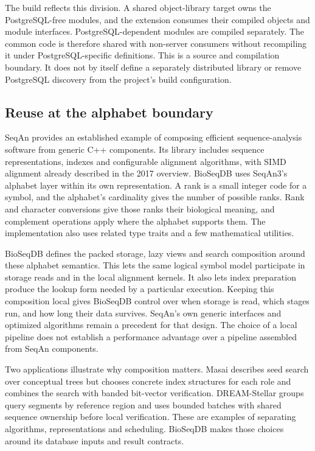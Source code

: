 The build reflects this division. A shared object-library target owns the
PostgreSQL-free modules, and the extension consumes their compiled objects
and module interfaces. PostgreSQL-dependent modules are compiled separately.
The common code is therefore shared with non-server consumers without
recompiling it under PostgreSQL-specific definitions. This is a source and
compilation boundary. It does not by itself define a separately distributed
library or remove PostgreSQL discovery from the project's build configuration.

\subsection{Reuse at the alphabet boundary}
\label{sec:arch-seqan-reuse}

SeqAn provides an established example of composing efficient sequence-analysis
software from generic C++ components. Its library includes sequence
representations, indexes and configurable alignment algorithms, with SIMD
alignment already described in the 2017 overview.\autocite{REINERT2017157,seqanManual}
BioSeqDB uses SeqAn3's alphabet layer within its own representation. A rank
is a small integer code for a symbol, and the alphabet's cardinality gives
the number of possible ranks. Rank and character conversions
give those ranks their biological meaning, and complement operations apply
where the alphabet supports them.\autocite{seqan3AlphabetsDocs}
The implementation also uses related type traits and a few mathematical
utilities.

BioSeqDB defines the packed storage, lazy views and search composition around
these alphabet semantics. This lets the same logical symbol model participate
in storage reads and in the local alignment kernels. It also lets index
preparation produce the lookup form needed by a particular execution.
Keeping this composition local gives BioSeqDB control over when storage is
read, which stages run, and how long their data survives. SeqAn's own generic
interfaces and optimized algorithms remain a precedent for that design.
The choice of a local pipeline does not establish a performance advantage
over a pipeline assembled from SeqAn components.

Two applications illustrate why composition matters. Masai describes seed
search over conceptual trees but chooses concrete index structures for each
role and combines the search with banded bit-vector
verification.\autocite{siragusa2012fastsensitivereadmapping}
DREAM-Stellar groups query segments by reference region and uses bounded
batches with shared sequence ownership before local
verification.\autocite{Aasna2026}
These are examples of separating algorithms, representations and scheduling.
BioSeqDB makes those choices around its database inputs and result contracts.

